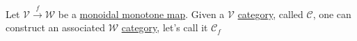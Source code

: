 Let $\mathcal{V}\xrightarrow{f}\mathcal{W}$ be a \hyperref[D2.41]{monoidal monotone map}. Given a $\mathcal{V}$ \hyperref[D2.46]{category}, called $\mathcal{C}$, one can construct an associated $\mathcal{W}$ \hyperref[D2.46]{category}, let's call it $\mathcal{C}_f$